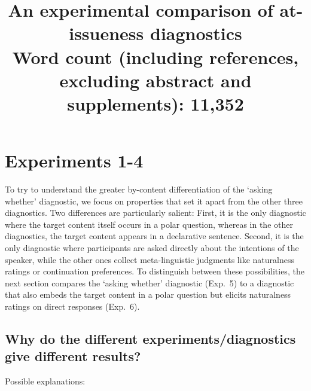 \documentclass[times,linguex]{glossa}
\title[Comparing at-issueness diagnostics]{An experimental comparison of at-issueness diagnostics\\ 
\bigskip \large
Word count (including references, excluding abstract and supplements): 11,352
}
\author[]%
{%
}
\begin{document}
\section{Experiments 1-4 \label{sec:2_experiments}}

To try to understand the greater by-content differentiation of the `asking whether' diagnostic, we focus on properties that set it apart from the other three diagnostics. Two differences are particularly salient: First, it is the only diagnostic where the target content itself occurs in a polar question, whereas in the other diagnostics, the target content appears in a declarative sentence. Second, it is the only diagnostic where participants are asked directly about the intentions of the speaker, while the other ones collect meta-linguistic judgments like naturalness ratings or continuation preferences. To distinguish between these possibilities, the next section compares the `asking whether' diagnostic (Exp.~5) to a diagnostic that also embeds the target content in a polar question but elicits naturalness ratings on direct responses (Exp.~6). 




\subsection*{Why do the different experiments/diagnostics give different results? \label{ssec:discussion-questions}}

\bigskip
\noindent
Possible explanations:
\end{document}
